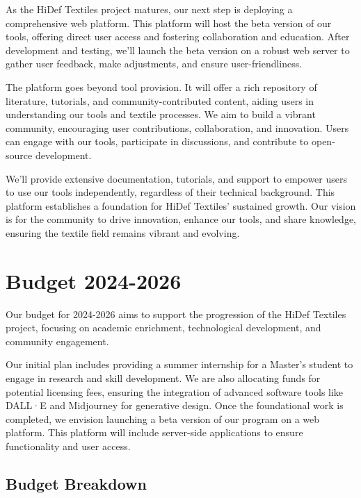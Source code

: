 \documentclass{article}
\begin{document}
    As the HiDef Textiles project matures, our next step is deploying a comprehensive web platform. This platform
    will host the beta version of our tools, offering direct user access and fostering collaboration and education.
    After development and testing, we'll launch the beta version on a robust web server to gather user feedback, make
    adjustments, and ensure user-friendliness.

    The platform goes beyond tool provision. It will offer a rich repository of literature, tutorials, and
    community-contributed content, aiding users in understanding our tools and textile processes. We aim to build a
    vibrant community, encouraging user contributions, collaboration, and innovation. Users can engage with our tools,
    participate in discussions, and contribute to open-source development.

    We'll provide extensive documentation, tutorials, and support to empower users to use our tools independently,
    regardless of their technical background. This platform establishes a foundation for HiDef Textiles' sustained
    growth. Our vision is for the community to drive innovation, enhance our tools, and share knowledge, ensuring the
    textile field remains vibrant and evolving.


    \section{Budget 2024-2026}

    Our budget for 2024-2026 aims to support the progression of the HiDef Textiles project, focusing on academic
    enrichment, technological development, and community engagement.

    Our initial plan includes providing a summer internship for a Master's student to engage in research and skill
    development.
    We are also allocating funds for potential licensing fees, ensuring the integration of advanced software tools
    like DALL·E and Midjourney for generative design.
    Once the foundational work is completed, we envision launching a beta version of our program on a web platform.
    This platform will include server-side applications to ensure functionality and user access.

    \subsection{Budget Breakdown}
\end{document}
